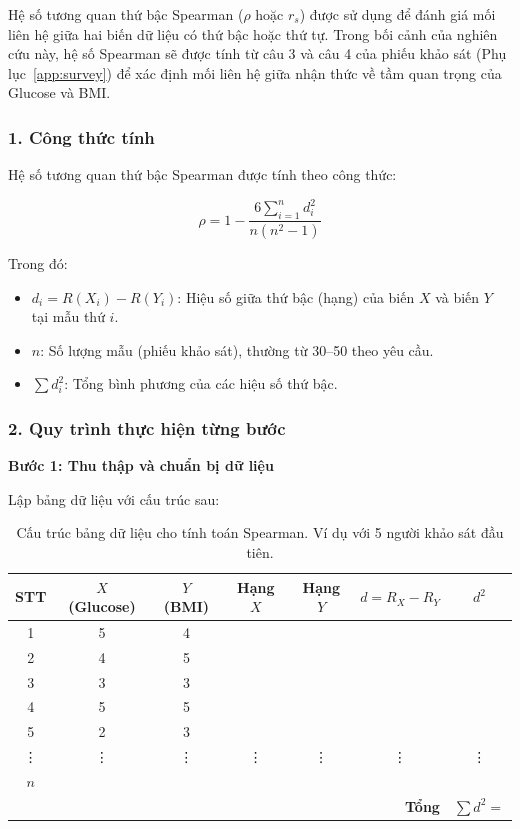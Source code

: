 \documentclass[14pt,a4paper]{extreport}
\begin{document}
Hệ số tương quan thứ bậc Spearman ($\rho$ hoặc $r_s$) được sử dụng để đánh giá mối liên hệ giữa hai biến dữ liệu có thứ bậc hoặc thứ tự. Trong bối cảnh của nghiên cứu này, hệ số Spearman sẽ được tính từ câu 3 và câu 4 của phiếu khảo sát (Phụ lục~\ref{app:survey}) để xác định mối liên hệ giữa nhận thức về tầm quan trọng của Glucose và BMI.

\subsubsection*{1. Công thức tính}

Hệ số tương quan thứ bậc Spearman được tính theo công thức:

\begin{equation}
\label{eq:spearman}
\rho = 1 - \frac{6 \sum_{i=1}^{n} d_i^2}{n(n^2 - 1)}
\end{equation}

\noindent Trong đó:
\begin{itemize}
  \item $d_i = R(X_i) - R(Y_i)$: Hiệu số giữa thứ bậc (hạng) của biến $X$ và biến $Y$ tại mẫu thứ $i$.
  \item $n$: Số lượng mẫu (phiếu khảo sát), thường từ 30--50 theo yêu cầu.
  \item $\sum d_i^2$: Tổng bình phương của các hiệu số thứ bậc.
\end{itemize}

\subsubsection*{2. Quy trình thực hiện từng bước}

\textbf{Bước 1: Thu thập và chuẩn bị dữ liệu}

Lập bảng dữ liệu với cấu trúc sau:

\begin{table}[htbp]
  \centering
  \small
  \caption{Cấu trúc bảng dữ liệu cho tính toán Spearman. Ví dụ với 5 người khảo sát đầu tiên.}
  \label{tab:spearman-data}
  \begin{tabular}{ccccccc}
    \toprule
    \textbf{STT} & $X$ (Glucose) & $Y$ (BMI) & Hạng $X$ & Hạng $Y$ & $d = R_X - R_Y$ & $d^2$ \\
    \midrule
    1 & 5 & 4 & & & & \\
    2 & 4 & 5 & & & & \\
    3 & 3 & 3 & & & & \\
    4 & 5 & 5 & & & & \\
    5 & 2 & 3 & & & & \\
    \vdots & \vdots & \vdots & \vdots & \vdots & \vdots & \vdots \\
    $n$ & \multicolumn{6}{c}{} \\
    \bottomrule
    \multicolumn{6}{r}{\textbf{Tổng}} & $\sum d^2 = $ \\
  \end{tabular}
\end{table}
\end{document}
